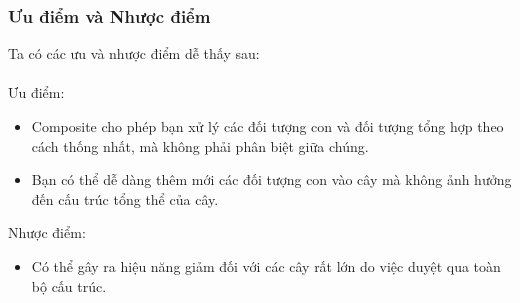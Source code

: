 \subsubsection{Ưu điểm và Nhược điểm}
Ta có các ưu và nhược điểm dễ thấy sau:\\\\
Ưu điểm:
\begin{itemize}
    \item Composite cho phép bạn xử lý các đối tượng con và đối tượng tổng hợp theo cách thống nhất, mà không phải phân biệt giữa chúng.
    \item Bạn có thể dễ dàng thêm mới các đối tượng con vào cây mà không ảnh hưởng đến cấu trúc tổng thể của cây.
\end{itemize}
Nhược điểm:
\begin{itemize}
    \item Có thể gây ra hiệu năng giảm đối với các cây rất lớn do việc duyệt qua toàn bộ cấu trúc.
\end{itemize}
